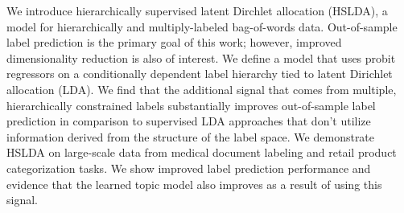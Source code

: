 We introduce hierarchically supervised latent Dirchlet allocation (HSLDA), a model for hierarchically and multiply-labeled bag-of-words data.  Out-of-sample label prediction is the primary goal of this work; however, improved dimensionality reduction is also of interest.  We define a model that uses probit regressors on a conditionally dependent label hierarchy tied to latent Dirichlet allocation (LDA).  We find that the additional signal that comes from multiple, hierarchically constrained labels substantially improves out-of-sample label prediction in comparison to supervised LDA approaches that don't utilize information derived from the structure of the label space.   We demonstrate HSLDA on large-scale data from medical document labeling and retail product categorization tasks.  We show improved label prediction performance and evidence that the learned topic model also improves as a result of using this signal.  


